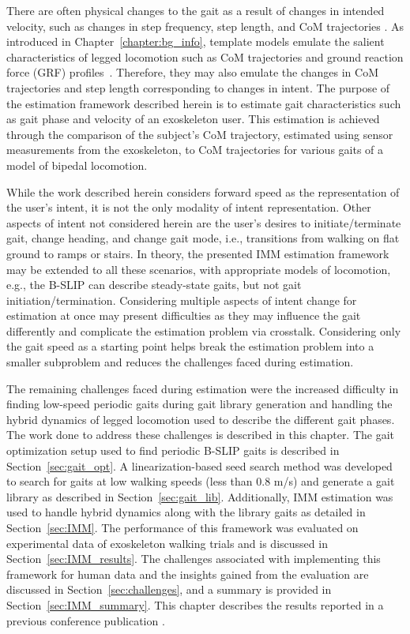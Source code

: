 There are often physical changes to the gait as a result of changes in intended velocity, such as changes in step frequency, step length, and CoM trajectories \cite{kuo2001simple}. As introduced in Chapter~\ref{chapter:bg_info}, template models emulate the salient characteristics of legged locomotion such as CoM trajectories and ground reaction force (GRF) profiles~\cite{mochon1980ballistic}. Therefore, they may also emulate the changes in CoM trajectories and step length corresponding to changes in intent. The purpose of the estimation framework described herein is to estimate gait characteristics such as gait phase and velocity of an exoskeleton user. This estimation is achieved through the comparison of the subject's CoM trajectory, estimated using sensor measurements from the exoskeleton, to CoM trajectories for various gaits of a model of bipedal locomotion.

While the work described herein considers forward speed as the representation of the user's intent, it is not the only modality of intent representation. Other aspects of intent not considered herein are the user's desires to initiate/terminate gait, change heading, and change gait mode, i.e., transitions from walking on flat ground to ramps or stairs. In theory, the presented IMM estimation framework may be extended to all these scenarios, with appropriate models of locomotion, e.g., the B-SLIP can describe steady-state gaits, but not gait initiation/termination. Considering multiple aspects of intent change for estimation at once may present difficulties as they may influence the gait differently and complicate the estimation problem via crosstalk. Considering only the gait speed as a starting point helps break the estimation problem into a smaller subproblem and reduces the challenges faced during estimation.

The remaining challenges faced during estimation were the increased difficulty in finding low-speed periodic gaits during gait library generation and handling the hybrid dynamics of legged locomotion used to describe the different gait phases. The work done to address these challenges is described in this chapter. The gait optimization setup used to find periodic B-SLIP gaits is described in Section~\ref{sec:gait_opt}. A linearization-based seed search method was developed to search for gaits at low walking speeds (less than 0.8 m/s) and generate a gait library as described in Section~\ref{sec:gait_lib}. Additionally, IMM estimation was used to handle hybrid dynamics along with the library gaits as detailed in Section~\ref{sec:IMM}. The performance of this framework was evaluated on experimental data of exoskeleton walking trials and is discussed in Section~\ref{sec:IMM_results}. The challenges associated with implementing this framework for human data and the insights gained from the evaluation are discussed in Section~\ref{sec:challenges}, and a summary is provided in Section~\ref{sec:IMM_summary}. This chapter describes the results reported in a previous conference publication \cite{karulkarapplication}.

